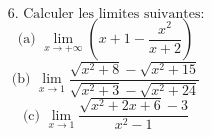 \documentclass{article}
\begin{document}
\[ \text{6. Calculer les limites suivantes:} \]
\[ \text{(a) } \lim_{x \to +\infty} \left( x + 1 - \frac{x^2}{x + 2} \right) \]
\[ \text{(b) } \lim_{x \to 1} \frac{\sqrt{x^2 + 8} - \sqrt{x^2 + 15}}{\sqrt{x^2 + 3} - \sqrt{x^2 + 24}} \]
\[ \text{(c) } \lim_{x \to 1} \frac{\sqrt{x^2 + 2x + 6} - 3}{x^2 - 1} \]
\end{document}
